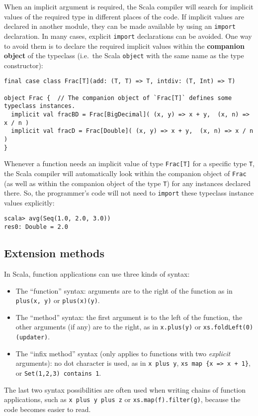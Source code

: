 When an implicit argument is required, the Scala compiler will search
for implicit values of the required type in different places of the
code. If implicit values are declared in another module, they can
be made available by using an \lstinline!import! declaration. In
many cases, explicit \lstinline!import! declarations can be avoided.
One way to avoid them is to declare the required implicit values within
the \textbf{companion object} of the typeclass
(i.e.~the Scala \lstinline!object! with the same name as the type
constructor):
\begin{lstlisting}
final case class Frac[T](add: (T, T) => T, intdiv: (T, Int) => T)

object Frac {  // The companion object of `Frac[T]` defines some typeclass instances.
  implicit val fracBD = Frac[BigDecimal]( (x, y) => x + y,  (x, n) => x / n )
  implicit val fracD = Frac[Double]( (x, y) => x + y,  (x, n) => x / n )
}
\end{lstlisting}
Whenever a function needs an implicit value of type \lstinline!Frac[T]!
for a specific type \lstinline!T!, the Scala compiler will automatically
look within the companion object of \lstinline!Frac! (as well as
within the companion object of the type \lstinline!T!) for any instances
declared there. So, the programmer's code will not need to \lstinline!import!
these typeclass instance values explicitly:
\begin{lstlisting}
scala> avg(Seq(1.0, 2.0, 3.0))
res0: Double = 2.0
\end{lstlisting}


\subsection{Extension methods}

In Scala, function applications can use three kinds of syntax: 
\begin{itemize}
\item The ``function'' syntax: arguments are to the right of the function
as in \lstinline!plus(x, y)! or \lstinline!plus(x)(y)!.
\item The ``method'' syntax: the first argument is to the left of the
function, the other arguments (if any) are to the right, as in \lstinline!x.plus(y)!
or \lstinline!xs.foldLeft(0)(updater)!.
\item The ``infix method'' syntax (only applies to functions with two
\emph{explicit} arguments): no dot character is used, as in \lstinline!x plus y!,
\lstinline!xs map {x => x + 1}!, or \lstinline!Set(1,2,3) contains 1!.
\end{itemize}
The last two syntax possibilities are often used when writing chains
of function applications, such as \lstinline!x plus y plus z! or
\lstinline!xs.map(f).filter(g)!, because the code becomes easier
to read. 

